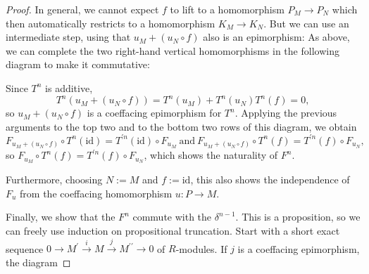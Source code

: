 \documentclass{amsart}
\theoremstyle{plain}
\numberwithin{equation}{section} %
\numberwithin{figure}{section} %
\theoremstyle{plain}
\theoremstyle{plain}
\theoremstyle{plain}
\theoremstyle{plain}
\theoremstyle{plain}
\theoremstyle{plain}
\theoremstyle{remark}
\theoremstyle{remark}
\theoremstyle{remark}
\begin{document}
\begin{proof}
In general, we cannot expect $f$ to lift to a homomorphism $P_M \rightarrow P_N$ which then automatically restricts to a homomorphism $K_M \rightarrow K_N$. But we can use an intermediate step, using that $u_M + (u_N \circ f)$ also is an epimorphism: As above, we can complete the two right-hand vertical homomorphisms in the following diagram to make it commutative:

\begin{center}
\end{center}

Since $T^n$ is additive,
\[ T^n(u_M + (u_N \circ f)) = T^n(u_M) + T^n(u_N)T^n(f) = 0, \]
so $u_M + (u_N \circ f)$ is a coeffacing epimorphism for $T^n$. Applying the previous arguments to the top two and to the bottom two rows of this diagram, we obtain 
\[ F_{u_M + (u_N \circ f)} \circ T^n(\mathrm{id}) = T^{\prime n}(\mathrm{id}) \circ F_{u_M}\ \mathrm{and\ }
  F_{u_M + (u_N \circ f)}  \circ T^n(f) = T^{\prime n}(f) \circ F_{u_N}, \]
so $F_{u_M}  \circ T^n(f) = T^{\prime n}(f) \circ F_{u_N}$, which shows the naturality of $F^n$.

Furthermore, choosing $N := M$ and $f := \mathrm{id}$, this also shows the independence of $F_u$ from the coeffacing homomorphism $u: P \rightarrow M$. 

Finally, we show that the $F^n$ commute with the $\delta^{n-1}$. This is a proposition, so we can freely use induction on propositional truncation. Start with a short exact sequence $0 \rightarrow M^\prime \stackrel{i}{\rightarrow} M \stackrel{j}{\rightarrow} M^{\prime\prime} \rightarrow 0$ of $R$-modules. If $j$ is a coeffacing epimorphism, the diagram


\end{proof}
\end{document}

